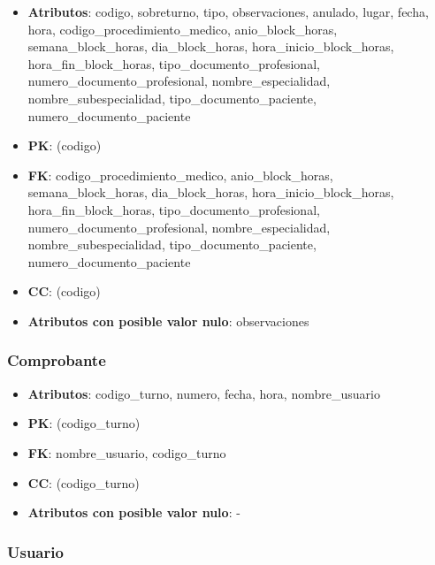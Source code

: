\documentclass[a4paper,11pt]{article}
\begin{document}
\begin{itemize}

\item 
\textbf{Atributos}: codigo, sobreturno, tipo, observaciones, anulado, lugar, fecha, hora,  codigo\_procedimiento\_medico, 
anio\_block\_horas, semana\_block\_horas, dia\_block\_horas, hora\_inicio\_block\_horas, hora\_fin\_block\_horas,
tipo\_documento\_profesional, numero\_documento\_profesional, nombre\_especialidad, 
nombre\_subespecialidad, tipo\_documento\_paciente, numero\_documento\_paciente

\item 
\textbf{PK}: (codigo)

\item
\textbf{FK}: codigo\_procedimiento\_medico, 
anio\_block\_horas, semana\_block\_horas, dia\_block\_horas, hora\_inicio\_block\_horas, hora\_fin\_block\_horas,
tipo\_documento\_profesional, numero\_documento\_profesional, nombre\_especialidad,
nombre\_subespecialidad, tipo\_documento\_paciente, numero\_documento\_paciente

\item 
\textbf{CC}: (codigo)

\item 
\textbf{Atributos con posible valor nulo}: observaciones

\end{itemize}
\subsubsection{\textbf{Comprobante}}

\begin{itemize}

\item 
\textbf{Atributos}: codigo\_turno, numero, fecha, hora, nombre\_usuario

\item 
\textbf{PK}: (codigo\_turno)

\item
\textbf{FK}:  nombre\_usuario, codigo\_turno

\item 
\textbf{CC}: (codigo\_turno)

\item 
\textbf{Atributos con posible valor nulo}: -

\end{itemize}
\subsubsection{\textbf{Usuario}}
\end{document}
